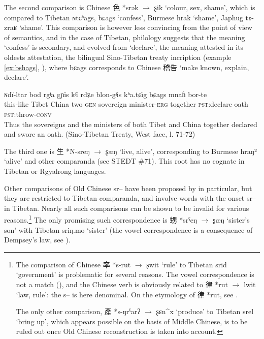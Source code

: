 \documentclass[oldfontcommands,oneside,a4paper,11pt]{article}
\newcommand{\ipa}[1]{{\phon #1}} %
\newcommand{\zh}[1]{{\cn #1}}
\newcommand{\archaic}[4]{\zh{#1} *\ipa{#2} $\rightarrow$ \ipa{#3} `#4'}
\begin{document}
The second comparison is Chinese \archaic{色}{srək}{ʂik}{colour, sex, shame}, which is compared to Tibetan \ipa{ɴtɕʰags}, \ipa{bɕags} `confess', Burmese \ipa{hrak} `shame', Japhug \ipa{tɤ-zraʁ} `shame'. This comparison is however less convincing from the point of view of semantics, and in the case of Tibetan, philology suggests that the meaning `confess' is secondary, and evolved from `declare', the meaning attested in its oldests attestation, the bilingual Sino-Tibetan treaty incription (example \ref{ex:bshags}, \citealt[40,80]{licoblin87}), where 	\ipa{bɕags} corresponds to Chinese \zh{稽告} `make known, explain, declare'.


\begin{exe}
\ex \label{ex:bshags}
\gll
\ipa{ɴdï-ltar} 	\ipa{bod} 	\ipa{rgʲa} 	\ipa{gɲïs} 	\ipa{kʲï} 	\ipa{rdʑe} \ipa{blon-gʲis} 	\ipa{kʰa.tɕïg} 	\ipa{bɕags} 	\ipa{mnaɦ} 	\ipa{bor-te} \\
this-like Tibet China two \textsc{gen} sovereign minister-\textsc{erg} together \textsc{pst}:declare oath \textsc{pst}:throw-\textsc{conv} \\
\glt Thus the sovereigns and the ministers of both Tibet and China together declared and swore an oath. (Sino-Tibetan Treaty, West face, l. 71-72)
\end{exe}

The third one is \archaic{生}{N-sreŋ}{ʂæŋ}{live, alive}, corresponding to Burmese \ipa{hraŋ²} `alive' and other comparanda (see STEDT \#71). This root has no cognate in Tibetan or Rgyalrong languages.

Other comparisons of Old Chinese \ipa{*sr--} have been proposed by \citet{coblin86handlist} in particular, but they are restricted to Tibetan comparanda, and involve words with the onset \ipa{sr--} in Tibetan. Nearly all such comparisons can be shown to be invalid for various reasons.\footnote{The comparison of Chinese \archaic{率}{s-rut}{ʂwit}{rule} to Tibetan \ipa{srid} `government' is problematic for several reasons. The vowel correspondence is not a match (\citealt{gong95st}), and the Chinese verb is obviously related to \archaic{律}{rut}{lwit}{law, rule}: the \ipa{s--} is here denominal. On the etymology of \zh{律} *\ipa{rut}, see \citet{sagart14lv}.

The only other comparison, \archaic{產}{s-ŋrˁarʔ}{ʂɛn^x}{produce} to Tibetan \ipa{srel} `bring up', which appears possible on the basis of Middle Chinese, is to be ruled out once Old Chinese reconstruction is taken into account.
}
The only promising such correspondence is \archaic{甥}{srˁeŋ}{ʂæŋ}{sister's son} with Tibetan \ipa{sriŋ.mo} `sister' (the vowel correspondence is a consequence of Dempsey's law, see \citealt{hill14dempsey}).
\end{document}
